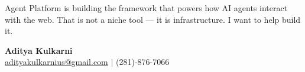 \documentclass[11pt,letterpaper]{article}
\begin{document}
\vspace{8pt}

Agent Platform is building the framework that powers how AI agents interact with the web. That is not a niche tool --- it is infrastructure. I want to help build it.

\vspace{12pt}

{\color{BBBlue} \textbf{Aditya Kulkarni}} \\
\href{mailto:adityakulkarnius@gmail.com}{adityakulkarnius@gmail.com} \quad $|$ \quad (281)-876-7066
\end{document}
